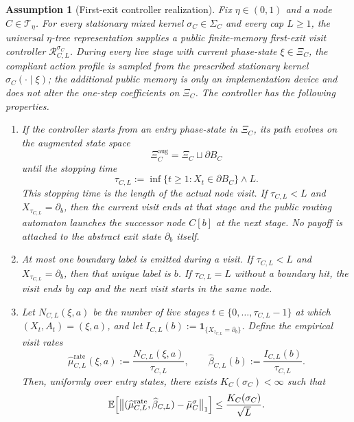 \documentclass[12pt]{article}
\newtheorem{assumption}[theorem]{Assumption}
\theoremstyle{definition}
\newcommand{\E}{\mathbb{E}}
\newcommand{\1}{\mathbf{1}}
\newcommand{\cT}{\mathcal{T}}
\begin{document}
\begin{assumption}[First-exit controller realization]
\label{ass:controller-input}
Fix $\eta\in(0,1)$ and a node $C\in\cT_\eta$. For every stationary mixed kernel
$\sigma_C\in\Sigma_C$ and every cap $L\ge 1$, the universal
$\eta$-tree representation supplies a public finite-memory first-exit
\emph{visit controller} $\mathcal R_{C,L}^{\sigma_C}$. During every live stage
with current phase-state $\xi\in\Xi_C$, the compliant action profile is sampled
from the prescribed stationary kernel $\sigma_C(\cdot\mid\xi)$; the additional
public memory is only an implementation device and does not alter the one-step
coefficients on $\Xi_C$. The controller has the following properties.
\begin{enumerate}[label=\textnormal{(R\arabic*)},leftmargin=2.8em]
\item If the controller starts from an entry phase-state in $\Xi_C$, its path
evolves on the augmented state space
\[
\Xi_C^{\mathrm{aug}}=\Xi_C\sqcup\partial B_C
\]
until the stopping time
\[
\tau_{C,L}
:=
\inf\{t\ge 1:X_t\in\partial B_C\}\wedge L.
\]
This stopping time is the length of the actual node visit. If
$\tau_{C,L}<L$ and $X_{\tau_{C,L}}=\partial_b$, then the current visit ends at
that stage and the public routing automaton launches the successor node $C[b]$
at the next stage. No payoff is attached to the abstract exit state
$\partial_b$ itself.
\item At most one boundary label is emitted during a visit. If
$\tau_{C,L}<L$ and $X_{\tau_{C,L}}=\partial_b$, then that unique label is $b$.
If $\tau_{C,L}=L$ without a boundary hit, the visit ends by cap and the next
visit starts in the same node.
\item Let $N_{C,L}(\xi,a)$ be the number of live stages
$t\in\{0,\dots,\tau_{C,L}-1\}$ at which $(X_t,A_t)=(\xi,a)$, and let
$I_{C,L}(b):=\1_{\{X_{\tau_{C,L}}=\partial_b\}}$. Define the empirical visit
rates
\[
\widehat\mu_{C,L}^{\mathrm{rate}}(\xi,a):=\frac{N_{C,L}(\xi,a)}{\tau_{C,L}},
\qquad
\widehat\beta_{C,L}(b):=\frac{I_{C,L}(b)}{\tau_{C,L}}.
\]
Then, uniformly over entry states, there exists $K_C(\sigma_C)<\infty$ such that
\begin{equation}
\label{eq:controller-input-occ}
\E\Bigl[
\bigl\|(\widehat\mu_{C,L}^{\mathrm{rate}},\widehat\beta_{C,L})
-
\bar\mu_C^\sigma
\bigr\|_1
\Bigr]
\le \frac{K_C(\sigma_C)}{\sqrt L}.
\end{equation}
\end{enumerate}
\end{assumption}
\end{document}
